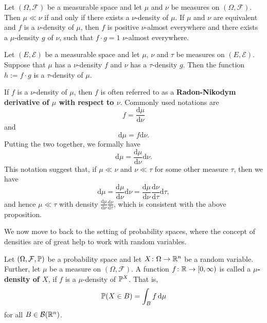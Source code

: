 \begin{proposition}
    \label{prop:radon-nikodym}
    Let $(\Omega, \mathcal{F})$ be a measurable space and let $\mu$ and $\nu$ be measures
    on $(\Omega, \mathcal{F})$. Then $\mu \ll \nu$
    if and only if there exists a $\nu$-density of $\mu$.
    If $\mu$ and $\nu$ are equivalent and $f$ is a $\nu$-density of $\mu$, then $f$ is positive
    $\nu$-almost everywhere
    and there exists a $\mu$-density $g$ of $\nu$, such that $f \cdot g = 1$ $\nu$-almost everywhere.
\end{proposition}
\begin{proposition}
    \label{prop:density-chain-rule}
    Let $(E, \mathcal{E})$ be a measurable space and let $\mu$, $\nu$ and $\tau$
    be measures on $(E, \mathcal{E})$. Suppose that $\mu$ has a $\nu$-density $f$ and $\nu$ has a $\tau$-density
    $g$. Then the function $h := f \cdot g$ is a $\tau$-density of $\mu$.
\end{proposition}
If $f$ is a $\nu$-density of $\mu$, then $f$ is often referred to as a \textbf{Radon-Nikodym derivative of $\mu$
with respect to $\nu$}. Commonly used notations are
\[
    f = \frac{\text{d}\mu}{\text{d}\nu}
\]
and
\[
    \text{d}\mu = f \text{d}\nu.
\]
Putting the two together, we formally have
\[
    \text{d}\mu = \frac{\text{d}\mu}{\text{d}\nu} \text{d}\nu.
\]
This notation suggest that, if $\mu \ll \nu$ and $\nu \ll \tau$ for some other measure $\tau$, then we have
\[
    \text{d}\mu = \frac{\text{d}\mu}{\text{d}\nu} \text{d}\nu
    = \frac{\text{d}\mu}{\text{d}\nu} \frac{\text{d}\nu}{\text{d}\tau} \text{d}\tau,
\]
and hence $\mu \ll \tau$ with density $\frac{\text{d}\mu}{\text{d}\nu} \frac{\text{d}\nu}{\text{d}\tau}$,
which is consistent with the above proposition.

We now move to back to the setting of probability spaces, where the concept of
densities are of great help to work with random variables.
\begin{definition}
    Let $(\Omega, \mathcal{F}, \mathbb{P})$ be a probability space and let $X\colon \Omega \to \mathbb{R}^n$ be a
    random variable. Further, let $\mu$ be a measure on $(\Omega, \mathcal{F})$.
    A function $f\colon\mathbb{R}\to [0,\infty)$ is called a \textbf{$\mu$-density of $X$},
    if $f$ is a $\mu$-density of $\mathbb{P}^X$. That is,
    \[
        \mathbb{P}(X \in B) = \int_{B} f \, \textnormal{d}\mu
    \]
    for all $B\in\mathcal{B}(\mathbb{R}^n)$.
\end{definition}

